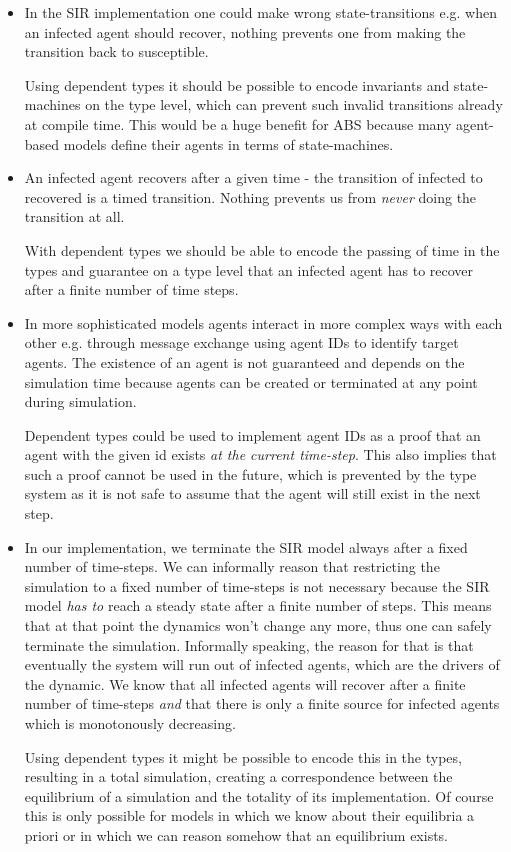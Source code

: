 \begin{itemize}
	\item In the SIR implementation one could make wrong state-transitions e.g. when an infected agent should recover, nothing prevents one from making the transition back to susceptible. 
	
	Using dependent types it should be possible to encode invariants and state-machines on the type level, which can prevent such invalid transitions already at compile time. This would be a huge benefit for ABS because many agent-based models define their agents in terms of state-machines.
	
	\item An infected agent recovers after a given time - the transition of infected to recovered is a timed transition. Nothing prevents us from \textit{never} doing the transition at all. 
	
	With dependent types we should be able to encode the passing of time in the types and guarantee on a type level that an infected agent has to recover after a finite number of time steps.
	
	\item In more sophisticated models agents interact in more complex ways with each other e.g. through message exchange using agent IDs to identify target agents. The existence of an agent is not guaranteed and depends on the simulation time because agents can be created or terminated at any point during simulation. 
	
	Dependent types could be used to implement agent IDs as a proof that an agent with the given id exists \textit{at the current time-step}. This also implies that such a proof cannot be used in the future, which is prevented by the type system as it is not safe to assume that the agent will still exist in the next step.

	\item In our implementation, we terminate the SIR model always after a fixed number of time-steps. We can informally reason that restricting the simulation to a fixed number of time-steps is not necessary because the SIR model \textit{has to} reach a steady state after a finite number of steps. This means that at that point the dynamics won't change any more, thus one can safely terminate the simulation. Informally speaking, the reason for that is that eventually the system will run out of infected agents, which are the drivers of the dynamic. We know that all infected agents will recover after a finite number of time-steps \textit{and} that there is only a finite source for infected agents which is monotonously decreasing. 
	
	Using dependent types it might be possible to encode this in the types, resulting in a total simulation, creating a correspondence between the equilibrium of a simulation and the totality of its implementation. Of course this is only possible for models in which we know about their equilibria a priori or in which we can reason somehow that an equilibrium exists.
\end{itemize}